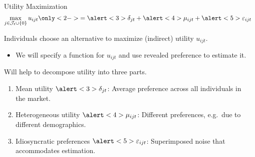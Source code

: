 \documentclass[aspectratio=169,t,11pt,table]{beamer}
\begin{document}
\begin{frame}{Utility Maximization}
    \vspace{-\baselineskip}
    \begin{equation*}
        \max_{j \in \mathcal{J}_t \cup \{0\}} u_{ijt} \only<2->{= \alert<3>{\delta_{jt}} + \alert<4>{\mu_{ijt}} + \alert<5>{\varepsilon_{ijt}}}
    \end{equation*}
    \vspace{-0.5\baselineskip}
    \begin{wideitemize}
        \item Individuals choose an alternative to maximize (indirect) utility $u_{ijt}$.
        \begin{itemize}
            \item We will specify a function for $u_{ijt}$ and use revealed preference to estimate it.
        \end{itemize}
        \pause
        \item Will help to decompose utility into three parts.
        \pause
        \begin{enumerate}
            \item Mean utility $\alert<3>{\delta_{jt}}$: Average preference across all individuals in the market.
            \pause
            \item Heterogeneous utility $\alert<4>{\mu_{ijt}}$: Different preferences, e.g.\ due to different demographics.
            \pause
            \item Idiosyncratic preferences $\alert<5>{\varepsilon_{ijt}}$: Superimposed noise that accommodates estimation.
        \end{enumerate}
    \end{wideitemize}
\end{frame}
\end{document}
